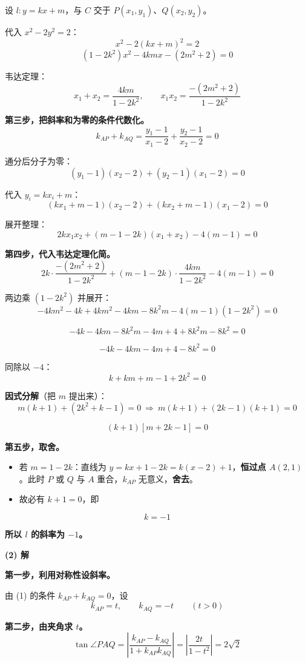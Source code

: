 设 $l:y=kx+m$，与 $C$ 交于 $P\left(x_1,y_1\right)$、$Q\left(x_2,y_2\right)$。

代入 $x^{2}-2y^{2}=2$：
\[x^{2}-2(kx+m)^{2}=2\]
\[\left(1-2k^{2}\right)x^{2}-4kmx-\left(2m^{2}+2\right)=0\]

韦达定理：
\[x_1+x_2=\frac{4km}{1-2k^{2}},\qquad x_1x_2=\frac{-\left(2m^{2}+2\right)}{1-2k^{2}}\]

\textbf{第三步，把斜率和为零的条件代数化。}
\[k_{AP}+k_{AQ}=\frac{y_1-1}{x_1-2}+\frac{y_2-1}{x_2-2}=0\]

通分后分子为零：
\[\left(y_1-1\right)\left(x_2-2\right)+\left(y_2-1\right)\left(x_1-2\right)=0\]

代入 $y_i=kx_i+m$：
\[\left(kx_1+m-1\right)\left(x_2-2\right)+\left(kx_2+m-1\right)\left(x_1-2\right)=0\]

展开整理：
\[2kx_1x_2+(m-1-2k)\left(x_1+x_2\right)-4(m-1)=0\]

\textbf{第四步，代入韦达定理化简。}
\[2k\cdot\frac{-\left(2m^{2}+2\right)}{1-2k^{2}}+(m-1-2k)\cdot\frac{4km}{1-2k^{2}}-4(m-1)=0\]

两边乘 $\left(1-2k^{2}\right)$ 并展开：
\[-4km^{2}-4k+4km^{2}-4km-8k^{2}m-4(m-1)\left(1-2k^{2}\right)=0\]

\[-4k-4km-8k^{2}m-4m+4+8k^{2}m-8k^{2}=0\]

\[-4k-4km-4m+4-8k^{2}=0\]

同除以 $-4$：
\[k+km+m-1+2k^{2}=0\]

\textbf{因式分解}（把 $m$ 提出来）：
\[m(k+1)+\left(2k^{2}+k-1\right)=0\ \Longrightarrow\ m(k+1)+(2k-1)(k+1)=0\]

\[(k+1)\left[m+2k-1\right]=0\]

\textbf{第五步，取舍。}

\begin{itemize}
\item 若 $m=1-2k$：直线为 $y=kx+1-2k=k(x-2)+1$，\textbf{恒过点 $A(2,1)$}。此时 $P$ 或 $Q$ 与 $A$ 重合，$k_{AP}$ 无意义，\textbf{舍去}。
\item 故必有 $k+1=0$，即
\end{itemize}
\[k=-1\]

\textbf{所以 $l$ 的斜率为 $-1$。}

\par\medskip

\textbf{(2) 解}

\textbf{第一步，利用对称性设斜率。}

由 (1) 的条件 $k_{AP}+k_{AQ}=0$，设
\[k_{AP}=t,\qquad k_{AQ}=-t\qquad(t>0)\]

\textbf{第二步，由夹角求 $t$。}
\[\tan\angle PAQ=\left|\frac{k_{AP}-k_{AQ}}{1+k_{AP}k_{AQ}}\right|=\left|\frac{2t}{1-t^{2}}\right|=2\sqrt2\]

